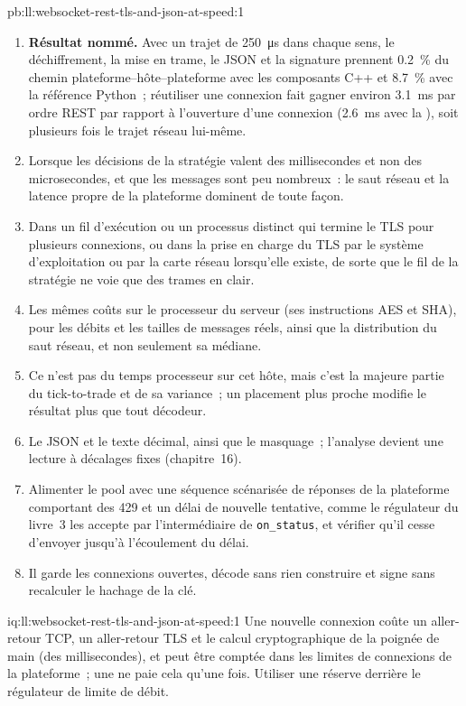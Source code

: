 \begin{solution}{pb:ll:websocket-rest-tls-and-json-at-speed:1}
\begin{enumerate}
\item \textbf{Résultat nommé.} Avec un trajet de \qty{250}{\micro\second} dans chaque sens, le déchiffrement, la mise en trame, le JSON et la signature prennent 0.2~\% du
chemin plateforme--hôte--plateforme avec les composants C++ et 8.7~\% avec la référence Python~; réutiliser une connexion fait gagner environ
\qty{3.1}{\milli\second} par ordre REST par rapport à l'ouverture d'une connexion (\qty{2.6}{\milli\second} avec la ), soit plusieurs fois
le trajet réseau lui-même.
\item Lorsque les décisions de la stratégie valent des millisecondes et non des microsecondes, et que les messages sont peu nombreux~: le saut réseau et la
latence propre de la plateforme dominent de toute façon.
\item Dans un fil d'exécution ou un processus distinct qui termine le TLS pour plusieurs connexions, ou dans la prise en charge du TLS par le système d'exploitation ou par la
carte réseau lorsqu'elle existe, de sorte que le fil de la stratégie ne voie que des trames en clair.
\item Les mêmes coûts sur le processeur du serveur (ses instructions AES et SHA), pour les débits et les tailles de messages réels, ainsi que la
distribution du saut réseau, et non seulement sa médiane.
\item Ce n'est pas du temps processeur sur cet hôte, mais c'est la majeure partie du tick-to-trade et de sa variance~; un placement plus proche modifie
le résultat plus que tout décodeur.
\item Le JSON et le texte décimal, ainsi que le masquage~; l'analyse devient une lecture à décalages fixes (chapitre~16).
\item Alimenter le pool avec une séquence scénarisée de réponses de la plateforme comportant des 429 et un délai de nouvelle tentative, comme le régulateur du livre~3 les accepte par
l'intermédiaire de \texttt{on\_status}, et vérifier qu'il cesse d'envoyer jusqu'à l'écoulement du délai.
\item Il garde les connexions ouvertes, décode sans rien construire et signe sans recalculer le hachage de la clé.
\end{enumerate}
\end{solution}

\begin{solution}{iq:ll:websocket-rest-tls-and-json-at-speed:1}
Une nouvelle connexion coûte un aller-retour TCP, un aller-retour TLS et le calcul cryptographique de la poignée de main (des millisecondes), et peut être comptée
dans les limites de connexions de la plateforme~; une  ne paie cela qu'une fois. Utiliser une réserve derrière le régulateur de limite de débit.
\end{solution}

